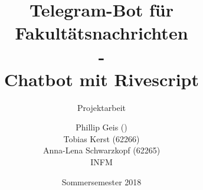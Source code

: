 \title{Telegram-Bot für Fakultätsnachrichten \\ - \\ Chatbot mit Rivescript}
\subtitle{Projektarbeit}
\author{%
  Phillip Geis () \\
	Tobias Kerst (62266) \\
  Anna-Lena Schwarzkopf (62265) \\
  INFM
}
\date{Sommersemester 2018}
\publishers{
    \textbf{Professor:} Prof. Dr. rer. nat. Peter A. Henning
}
\maketitle

\clearpage
